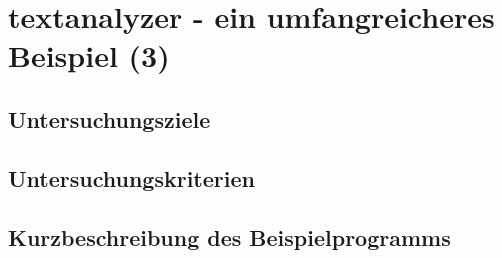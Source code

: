 \documentclass[a4paper, 12pt, listof=totoc, bibliography=totoc]{scrreprt}
\begin{document}
%



\section{textanalyzer - ein umfangreicheres Beispiel (3)}

\subsection{Untersuchungsziele}
\subsection{Untersuchungskriterien}
\subsection{Kurzbeschreibung des Beispielprogramms}
\end{document}
